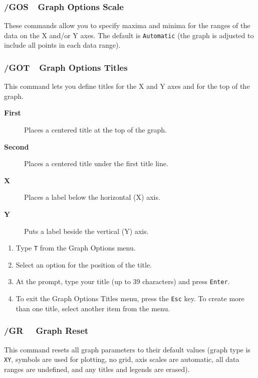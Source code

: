 \documentclass[titlepage]{article}
\begin{document}
\subsubsection{/GOS\ \     Graph Options Scale}

These commands allow you to specify maxima and minima for the ranges
of the data on the X and/or Y axes.  The default is \texttt{Automatic}
(the graph is adjusted to include all points in each data range). 

\subsubsection{/GOT\ \     Graph Options Titles}

This command lets you define titles for the X and Y axes and for the
top of the graph.
\begin{description}
\item[{\bf First }]{Places a centered title at the top of the graph.}
\item[{\bf Second }]{Places a centered title under the first title
    line.}
\item[{\bf X }]{Places a label below the horizontal (X) axis.}
\item[{\bf Y }]{Puts a label beside the vertical (Y) axis.}
\end{description}

\usage{}
\begin{enumerate}\itemsep -2pt
\item Type \texttt{T} from the Graph Options menu.
\item Select an option for the position of the title.
\item At the prompt, type your title (up to 39 characters) and 
  press \texttt{Enter}.
\item To exit the Graph Options Titles menu, press the \texttt{Esc}
  key.  To create more than one title, select another item from
  the menu.
\end{enumerate}
            
\subsubsection{/GR \ \     Graph Reset}

This command resets all graph parameters to their default values
(graph type is \texttt{XY}, symbols are used for plotting, no grid,
axis scales are automatic, all data ranges are undefined, and any
titles and legends are erased).
        
\end{document}
